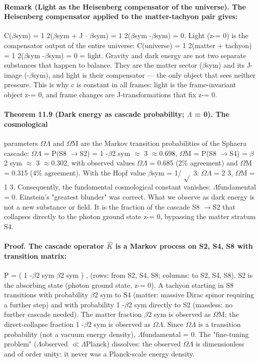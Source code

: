 \documentclass[12pt,a4paper]{article}
\begin{document}
\paragraph*{Remark (Light as the Heisenberg compensator of the universe). The Heisenberg compensator applied to the matter-tachyon pair gives:}
C($\beta$sym) = 1 2($\beta$sym + J $\cdot$ $\beta$sym) = 1 2($\beta$sym -$\beta$sym) = 0.
Light (z-= 0) is the compensator output of the entire universe: C(universe) = 1 2(matter + tachyon) = 1 2($\beta$sym -$\beta$sym) = 0 = light. Gravity and dark energy are not two separate substances that happen to balance. They are the matter sector ($\beta$sym) and its J-image (-$\beta$sym), and light is their compensator --- the only object that sees neither pressure. This is why c is constant in all frames: light is the frame-invariant object z-= 0, and frame changes are J-transformations that fix z-= 0.
\paragraph*{Theorem 11.9 (Dark energy as cascade probability; $\Lambda$ = 0). The cosmological}
parameters $\Omega$$\Lambda$ and $\Omega$M are the Markov transition probabilities of the Sphaera cascade: $\Omega$$\Lambda$ = P(S8 $\to$S2) = 1 -$\beta$2 sym $\approx$ 3 $\approx$0.698, $\Omega$M = P(S8 $\to$S4) = $\beta$2 sym $\approx$ 3 $\approx$0.302, with observed values $\Omega$$\Lambda$ = 0.685 (2\% agreement) and $\Omega$M = 0.315 (4\% agreement). With the Hopf value $\beta$sym = 1/ $\sqrt{}$ 3: $\Omega$$\Lambda$ = 2 3, $\Omega$M = 1
3.
Consequently, the fundamental cosmological constant vanishes: $\Lambda$fundamental =
0. Einstein's "greatest blunder" was correct.
What we observe as dark energy is not a new substance or field. It is the fraction of the cascade S8 $\to$S2 that collapses directly to the photon ground state z-= 0, bypassing the matter stratum S4.
\paragraph*{Proof. The cascade operator $\hat K$ is a Markov process on {S2, S4, S8} with transition matrix:}
P = (
1 -$\beta$2 sym $\beta$2 sym )
, (rows: from S2, S4, S8; columns: to S2, S4, S8). S2 is the absorbing state (photon ground state, z-= 0). A tachyon starting in S8 transitions with probability $\beta$2 sym to S4 (matter: massive Dirac spinor requiring a further step) and with probability 1 -$\beta$2 sym directly to S2 (massless: no further cascade needed). The matter fraction $\beta$2 sym is observed as $\Omega$M; the direct-collapse fraction 1 -$\beta$2 sym is observed as $\Omega$$\Lambda$. Since $\Omega$$\Lambda$ is a transition probability (not a vacuum energy density), $\Lambda$fundamental = 0. The "fine-tuning problem" ($\Lambda$observed $\ll$$\Lambda$Planck) dissolves: the
observed $\Omega$$\Lambda$ is dimensionless and of order unity; it never was a Planck-scale energy density.
\end{document}
